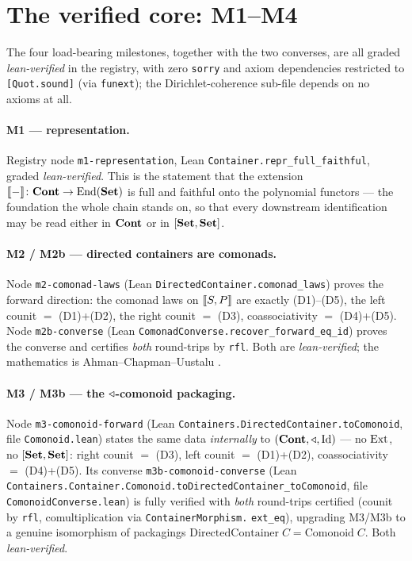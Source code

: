 \section{The verified core: M1--M4}\label{sec:mile-core}

The four load-bearing milestones, together with the two converses, are all graded
\emph{lean-verified} in the registry, with zero \texttt{sorry} and axiom
dependencies restricted to \texttt{[Quot.sound]} (via \texttt{funext}); the
Dirichlet-coherence sub-file depends on no axioms at all.

\paragraph{M1 --- representation.}
Registry node \texttt{m1-representation}, Lean
\texttt{Container.repr\_full\_faithful}, graded \emph{lean-verified}. This is the
statement that the extension $\llbracket - \rrbracket\colon\mathbf{Cont}\to\mathrm{End}(\mathbf{Set})$ is full and faithful
onto the polynomial functors --- the foundation the whole chain stands on, so that
every downstream identification may be read either in $\mathbf{Cont}$ or in $[\mathbf{Set},\mathbf{Set}]$.

\paragraph{M2 / M2b --- directed containers are comonads.}
Node \texttt{m2-comonad-laws} (Lean \texttt{DirectedContainer.comonad\_laws}) proves
the forward direction: the comonad laws on $\llbracket S,P \rrbracket$ are exactly (D1)--(D5), the
left counit $=$ (D1)+(D2), the right counit $=$ (D3), coassociativity $=$
(D4)+(D5). Node \texttt{m2b-converse} (Lean
\texttt{ComonadConverse.recover\_forward\_eq\_id}) proves the converse and certifies
\emph{both} round-trips by \texttt{rfl}. Both are \emph{lean-verified}; the
mathematics is Ahman--Chapman--Uustalu \cite{ACU14}.

\paragraph{M3 / M3b --- the $\triangleleft$-comonoid packaging.}
Node \texttt{m3-comonoid-forward} (Lean
\texttt{Containers.DirectedContainer.toComonoid}, file \texttt{Comonoid.lean})
states the same data \emph{internally} to $(\mathbf{Cont},\triangleleft,\mathrm{Id})$ --- no $\mathrm{Ext}$, no
$[\mathbf{Set},\mathbf{Set}]$: right counit $=$ (D3), left counit $=$ (D1)+(D2), coassociativity
$=$ (D4)+(D5). Its converse \texttt{m3b-comonoid-converse} (Lean
\texttt{Containers.Container.Comonoid.toDirectedContainer\_toComonoid}, file
\texttt{ComonoidConverse.lean}) is fully verified with \emph{both} round-trips
certified (counit by \texttt{rfl}, comultiplication via \texttt{ContainerMorphism.}
\texttt{ext\_eq}), upgrading M3/M3b to a genuine isomorphism of packagings
$\mathrm{DirectedContainer}\;C=\mathrm{Comonoid}\;C$. Both \emph{lean-verified}.

